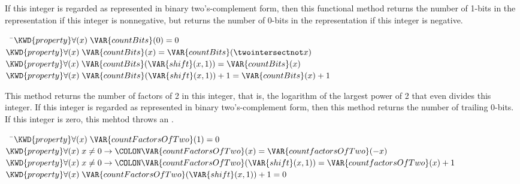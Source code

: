 If this integer is regarded as represented in binary two's-complement form,
then this functional method returns the number of 1-bits in the representation
if this integer is nonnegative, but returns the number of 0-bits in the representation
if this integer is negative.

\begin{Fortress}
{\tt~~}\pushtabs\=\+\(  \KWD{property} \forall(x)\; \VAR{countBits}(0) = 0\)\\
\(  \KWD{property} \forall(x)\; \VAR{countBits}(x) = \VAR{countBits}(\twointersectnot x)\)\\
\(  \KWD{property} \forall(x)\; \VAR{countBits}(\VAR{shift}(x,1)) = \VAR{countBits}(x)\)\\
\(  \KWD{property} \forall(x)\; \VAR{countBits}(\VAR{shift}(x,1)) + 1 = \VAR{countBits}(x) + 1\)\-\\\poptabs
\end{Fortress}



This method returns the number of factors of 2 in this integer, that is,
the logarithm of the largest power of 2 that even divides this integer.
If this integer is regarded as represented in binary two's-complement form,
then this method returns the number of trailing 0-bits.
If this integer is zero, this mehtod throws an .

\begin{Fortress}
{\tt~~}\pushtabs\=\+\(  \KWD{property} \forall(x)\; \VAR{countFactorsOfTwo}(1) = 0\)\\
\(  \KWD{property} \forall(x)\; x \neq 0 \rightarrow\COLON \VAR{countFactorsOfTwo}(x) = \VAR{countfactorsOfTwo}(-x)\)\\
\(  \KWD{property} \forall(x)\; x \neq 0 \rightarrow\COLON \VAR{countFactorsOfTwo}(\VAR{shift}(x,1)) = \VAR{countfactorsOfTwo}(x) + 1\)\\
\(  \KWD{property} \forall(x)\; \VAR{countFactorsOfTwo}(\VAR{shift}(x,1)) + 1 = 0\)\-\\\poptabs
\end{Fortress}


